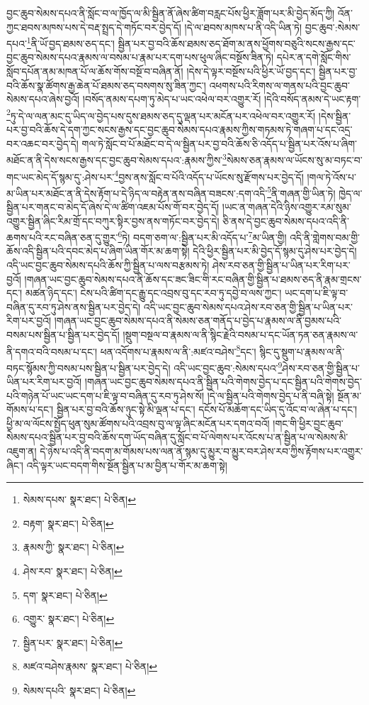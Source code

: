 བྱང་ཆུབ་སེམས་དཔའ་ནི་སློང་བ་ལ་ཁྱོད་ལ་མི་སྦྱིན་ནོ་ཞེས་ཚིག་བརླང་པོས་ཕྱིར་ཟློག་པར་མི་བྱེད་མོད་ཀྱི། འོན་ཀྱང་ཐབས་མཁས་པས་དེ་བརྡ་སྤྲད་དེ་གཏོང་བར་བྱེད་དོ། །དེ་ལ་ཐབས་མཁས་པ་ནི་འདི་ཡིན་ཏེ། བྱང་ཆུབ་:སེམས་དཔའ་\footnote{སེམས་དཔས་  སྣར་ཐང་།  པེ་ཅིན། }ནི་ཡོ་བྱད་ཐམས་ཅད་དང་། སྦྱིན་པར་བྱ་བའི་ཆོས་ཐམས་ཅད་ཐོག་མ་ནས་ཕྱོགས་བཅུའི་སངས་རྒྱས་དང་བྱང་ཆུབ་སེམས་དཔའ་རྣམས་ལ་བསམ་པ་རྣམ་པར་དག་པས་ཕུལ་ཞིང་བསྔོས་ཟིན་ཏེ། དཔེར་ན་དགེ་སློང་གིས་སློབ་དཔོན་ནམ་མཁན་པོ་ལ་ཆོས་གོས་བསྔོ་བ་བཞིན་ནོ། །དེས་དེ་ལྟར་བསྔོས་པའི་ཕྱིར་ཡོ་བྱད་དང་། སྦྱིན་པར་བྱ་བའི་ཆོས་སྣ་ཚོགས་རྒྱ་ཆེན་པོ་ཐམས་ཅད་བསགས་སུ་ཟིན་ཀྱང་། འཕགས་པའི་རིགས་ལ་གནས་པའི་བྱང་ཆུབ་སེམས་དཔའ་ཞེས་བྱའོ། །བསོད་ནམས་དཔག་ཏུ་མེད་པ་ཡང་འཕེལ་བར་འགྱུར་རོ། །དེའི་བསོད་ནམས་དེ་ཡང་རྟག་\footnote{བརྟག་  སྣར་ཐང་།  པེ་ཅིན། }ཏུ་དེ་ལ་ལན་མང་དུ་ཡིད་ལ་བྱེད་པས་དུས་ཐམས་ཅད་དུ་ལྡན་པར་མངོན་པར་འཕེལ་བར་འགྱུར་རོ། །དེས་སྦྱིན་པར་བྱ་བའི་ཆོས་དེ་དག་ཀྱང་སངས་རྒྱས་དང་བྱང་ཆུབ་སེམས་དཔའ་རྣམས་ཀྱིས་གཏམས་ཏེ་གཞག་པ་དང་འདྲ་བར་འཆང་བར་བྱེད་དེ། གལ་ཏེ་སློང་བ་པོ་མཐོང་བ་དེ་ལ་སྦྱིན་པར་བྱ་བའི་ཆོས་ཅི་འདོད་པ་སྦྱིན་པར་འོས་པ་ཞིག་མཐོང་ན་ནི་དེས་སངས་རྒྱས་དང་བྱང་ཆུབ་སེམས་དཔའ་:རྣམས་ཀྱིས་\footnote{རྣམས་ཀྱི་  སྣར་ཐང་།  པེ་ཅིན། }སེམས་ཅན་རྣམས་ལ་ཡོངས་སུ་མ་བཏང་བ་གང་ཡང་མེད་དོ་སྙམ་དུ་:ཤེས་པར་\footnote{ཤེས་རབ་  སྣར་ཐང་།  པེ་ཅིན། }བྱས་ནས་སློང་བ་པོའི་འདོད་པ་ཡོངས་སུ་རྫོགས་པར་བྱེད་དོ། །གལ་ཏེ་འོས་པ་མ་ཡིན་པར་མཐོང་ན་ནི་དེས་རྟོག་པ་དེ་ཉིད་ལ་བརྟེན་ནས་བཞིན་བཟངས་:དག་འདི་\footnote{དག་  སྣར་ཐང་།  པེ་ཅིན། }ནི་གཞན་གྱི་ཡིན་ཏེ། ཁྱེད་ལ་སྦྱིན་པར་གནང་བ་མེད་དོ་ཞེས་དེ་ལ་ཚིག་འཇམ་པོས་གོ་བར་བྱེད་དོ། །ཡང་ན་གཞན་དེའི་ཉིས་འགྱུར་རམ་སུམ་འགྱུར་སྦྱིན་ཞིང་རིམ་གྲོ་དང་བཀུར་སྟིར་བྱས་ནས་གཏོང་བར་བྱེད་དེ། ཅི་ནས་དེ་བྱང་ཆུབ་སེམས་དཔའ་འདི་ནི་ཆགས་པའི་རང་བཞིན་ཅན་དུ་གྱུར་\footnote{འགྱུར་  སྣར་ཐང་།  པེ་ཅིན། }ཏེ། བདག་ཅག་ལ་:སྦྱིན་པར་མི་འདོད་པ་\footnote{སྦྱིན་པར་  སྣར་ཐང་།  པེ་ཅིན། }མ་ཡིན་གྱི། འདི་ནི་གླེགས་བམ་གྱི་ཆོས་འདི་སྦྱིན་པའི་དབང་མེད་པ་ཞིག་ཡིན་གོར་མ་ཆག་སྟེ། དེའི་ཕྱིར་སྦྱིན་པར་མི་བྱེད་དོ་སྙམ་དུ་ཤེས་པར་བྱེད་དེ། འདི་ཡང་བྱང་ཆུབ་སེམས་དཔའི་ཆོས་ཀྱི་སྦྱིན་པ་ལས་བརྩམས་ཏེ། ཤེས་རབ་ཅན་གྱི་སྦྱིན་པ་ཡིན་པར་རིག་པར་བྱའོ། །གཞན་ཡང་བྱང་ཆུབ་སེམས་དཔའ་ནི་ཆོས་དང་ཟང་ཟིང་གི་རང་བཞིན་གྱི་སྦྱིན་པ་ཐམས་ཅད་ནི་རྣམ་གྲངས་དང་། མཚན་ཉིད་དང་། ངེས་པའི་ཚིག་དང་རྒྱུ་དང་འབྲས་བུ་དང་རབ་ཏུ་དབྱེ་བ་ལས་ཀྱང་། ཡང་དག་པ་ཇི་ལྟ་བ་བཞིན་དུ་རབ་ཏུ་ཤེས་ནས་སྦྱིན་པར་བྱེད་དེ། འདི་ཡང་བྱང་ཆུབ་སེམས་དཔའ་ཤེས་རབ་ཅན་གྱི་སྦྱིན་པ་ཡིན་པར་རིག་པར་བྱའོ། །གཞན་ཡང་བྱང་ཆུབ་སེམས་དཔའ་ནི་སེམས་ཅན་གནོད་པ་བྱེད་པ་རྣམས་ལ་ནི་བྱམས་པའི་བསམ་པས་སྦྱིན་པ་སྦྱིན་པར་བྱེད་དོ། །སྡུག་བསྔལ་བ་རྣམས་ལ་ནི་སྙིང་རྗེའི་བསམ་པ་དང་ཡོན་ཏན་ཅན་རྣམས་ལ་ནི་དགའ་བའི་བསམ་པ་དང་། ཕན་འདོགས་པ་རྣམས་ལ་ནི་:མཛའ་བཤེས་\footnote{མཛའ་བཤེས་རྣམས་  སྣར་ཐང་།  པེ་ཅིན། }དང་། སྙིང་དུ་སྡུག་པ་རྣམས་ལ་ནི་བཏང་སྙོམས་ཀྱི་བསམ་པས་སྦྱིན་པ་སྦྱིན་པར་བྱེད་དེ། འདི་ཡང་བྱང་ཆུབ་:སེམས་དཔའ་\footnote{སེམས་དཔའི་  སྣར་ཐང་།  པེ་ཅིན། }ཤེས་རབ་ཅན་གྱི་སྦྱིན་པ་ཡིན་པར་རིག་པར་བྱའོ། །གཞན་ཡང་བྱང་ཆུབ་སེམས་དཔའ་ནི་སྦྱིན་པའི་གེགས་བྱེད་པ་དང་སྦྱིན་པའི་གེགས་བྱེད་པའི་གཉེན་པོ་ཡང་ཡང་དག་པ་ཇི་ལྟ་བ་བཞིན་དུ་རབ་ཏུ་ཤེས་སོ། །དེ་ལ་སྦྱིན་པའི་གེགས་བྱེད་པ་ནི་བཞི་སྟེ། སྔོན་མ་གོམས་པ་དང་། སྦྱིན་པར་བྱ་བའི་ཆོས་ཉུང་སྟེ་མི་ལྡན་པ་དང་། དངོས་པོ་མཆོག་དང་ཡིད་དུ་འོང་བ་ལ་ཞེན་པ་དང་། ཕྱི་མ་ལ་ལོངས་སྤྱོད་ཕུན་སུམ་ཚོགས་པའི་འབྲས་བུ་ལ་ལྟ་ཞིང་མངོན་པར་དགའ་བའོ། །གང་གི་ཕྱིར་བྱང་ཆུབ་སེམས་དཔའ་སྦྱིན་པར་བྱ་བའི་ཆོས་དག་ཡོད་བཞིན་དུ་སློང་བ་པོ་ལེགས་པར་འོངས་པ་ན་སྦྱིན་པ་ལ་སེམས་མི་འཇུག་ན། དེ་ཉེས་པ་འདི་ནི་བདག་མ་གོམས་པས་ལན་ནོ་སྙམ་དུ་མྱུར་བ་མྱུར་བར་ཤེས་རབ་ཀྱིས་རྟོགས་པར་འགྱུར་ཞིང་། འདི་ལྟར་ཡང་བདག་གིས་སྔོན་སྦྱིན་པ་མ་བྱིན་པ་གོར་མ་ཆག་སྟེ། 
